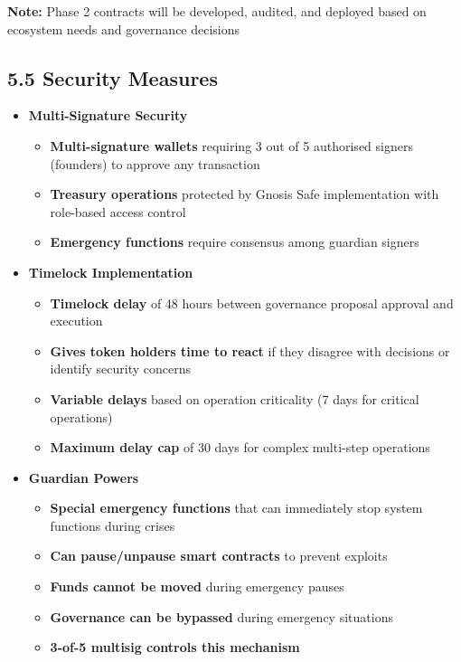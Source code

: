 \documentclass[
  paper=a4,
  ,captions=tableheading
]{scrartcl}
\makeatletter
\newcommand*\pandocbounded[1]{%
  \sbox\pandoc@box{#1}%
  \Gscale@div\@tempa{\textheight}{\dimexpr\ht\pandoc@box+\dp\pandoc@box\relax}%
  \Gscale@div\@tempb{\linewidth}{\wd\pandoc@box}%
  \ifdim\@tempb\p@<\@tempa\p@\let\@tempa\@tempb\fi%
  \ifdim\@tempa\p@<\p@\scalebox{\@tempa}{\usebox\pandoc@box}%
  \else\usebox{\pandoc@box}%
  \fi%
}
\providecommand{\tightlist}{%
  \setlength{\itemsep}{0pt}\setlength{\parskip}{0pt}}
\makeatother
\begin{document}
\textbf{Note:} Phase 2 contracts will be developed, audited, and deployed based on ecosystem needs and governance decisions

\subsection{5.5 Security Measures}\label{security-measures}

\begin{itemize}
\tightlist
\item
  \textbf{Multi-Signature Security}

  \begin{itemize}
  \tightlist
  \item
    \textbf{Multi-signature wallets} requiring 3 out of 5 authorised
    signers (founders) to approve any transaction
  \item
    \textbf{Treasury operations} protected by Gnosis Safe implementation
    with role-based access control
  \item
    \textbf{Emergency functions} require consensus among guardian
    signers
  \end{itemize}
\item
  \textbf{Timelock Implementation}

  \begin{itemize}
  \tightlist
  \item
    \textbf{Timelock delay} of 48 hours between governance proposal
    approval and execution
  \item
    \textbf{Gives token holders time to react} if they disagree with
    decisions or identify security concerns
  \item
    \textbf{Variable delays} based on operation criticality (7 days for
    critical operations)
  \item
    \textbf{Maximum delay cap} of 30 days for complex multi-step
    operations
  \end{itemize}
\item
  \textbf{Guardian Powers}

  \begin{itemize}
  \tightlist
  \item
    \textbf{Special emergency functions} that can immediately stop
    system functions during crises
  \item
    \textbf{Can pause/unpause smart contracts} to prevent exploits
  \item
    \textbf{Funds cannot be moved} during emergency pauses
  \item
    \textbf{Governance can be bypassed} during emergency situations
  \item
    \textbf{3-of-5 multisig controls this mechanism}
  \end{itemize}
\end{itemize}
\end{document}
